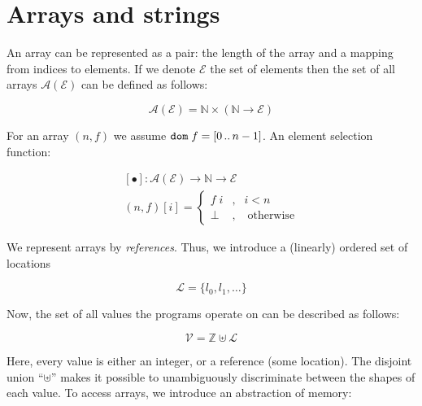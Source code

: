 \section{Arrays and strings}

An array can be represented as a pair: the length of the array and a mapping from indices to elements. If we denote
$\mathscr E$ the set of elements then the set of all arrays $\mathscr A (\mathscr E)$ can be defined as follows:

\[
\mathscr A(\mathscr E) = \mathbb N \times (\mathbb N \to \mathscr E)
\]

For an array $(n, f)$ we assume $\mathtt{dom}\;{f}=[0\,..\,n-1]$. An element selection function:

\[
\begin{array}{c}
  [\bullet] : \mathscr A (\mathscr E) \to \mathbb N \to \mathscr E\\[2mm]
  (n, f) [i] = \left\{
                  \begin{array}{rcl}
                     f\;i &, & i < n\\
                     \bot&,&\;\mbox{otherwise}
                  \end{array}
               \right.
\end{array}
\]

\begin{comment}
A set of (ASCII) characters:

\[
\mathscr C = [0\,..\,255]
\]

A string is an array of characters:

\[
\mathscr S = \mathscr A (\mathscr C)
\]

Adding strings and arrays to the language changes the set of values the programs operate on:
\end{comment}

We represent arrays by \emph{references}. Thus, we introduce a (linearly) ordered set of locations

\[
\mathscr L = \{l_0, l_1, \dots\}
\]

Now, the set of all values the programs operate on can be described as follows:

\[
    \mathscr V = \mathbb Z \uplus \mathscr L 
\]

Here, every value is either an integer, or a reference (some location). The disjoint union ``$\uplus$'' makes it possible to
unambiguously discriminate between the shapes of each value. To access arrays, we introduce an abstraction of memory:


